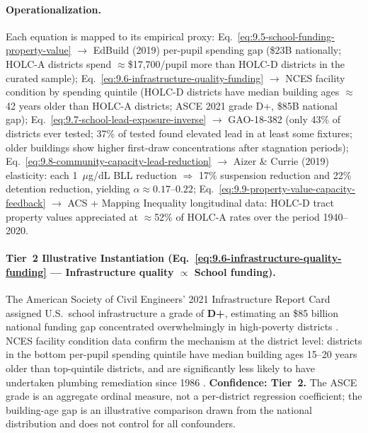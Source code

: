\paragraph{Operationalization.}
Each equation is mapped to its empirical proxy: Eq.~\ref{eq:9.5-school-funding-property-value} $\to$ EdBuild (2019) per-pupil spending gap (\$23B nationally; HOLC-A districts spend $\approx$\$17,700/pupil more than HOLC-D districts in the curated sample); Eq.~\ref{eq:9.6-infrastructure-quality-funding} $\to$ NCES facility condition by spending quintile (HOLC-D districts have median building ages $\approx$42 years older than HOLC-A districts; ASCE 2021 grade D+, \$85B national gap); Eq.~\ref{eq:9.7-school-lead-exposure-inverse} $\to$ GAO-18-382 (only 43\% of districts ever tested; 37\% of tested found elevated lead in at least some fixtures; older buildings show higher first-draw concentrations after stagnation periods); Eq.~\ref{eq:9.8-community-capacity-lead-reduction} $\to$ Aizer \& Currie (2019) elasticity: each 1~$\mu$g/dL BLL reduction $\Rightarrow$ 17\% suspension reduction and 22\% detention reduction, yielding $\alpha \approx 0.17$--$0.22$; Eq.~\ref{eq:9.9-property-value-capacity-feedback} $\to$ ACS + Mapping Inequality longitudinal data: HOLC-D tract property values appreciated at $\approx$52\% of HOLC-A rates over the period 1940--2020.

\paragraph{Tier~2 Illustrative Instantiation (Eq.~\ref{eq:9.6-infrastructure-quality-funding} --- Infrastructure quality $\propto$ School funding).}
The American Society of Civil Engineers' 2021 Infrastructure Report Card assigned U.S.\ school infrastructure a grade of \textbf{D+}, estimating an \$85 billion national funding gap concentrated overwhelmingly in high-poverty districts \cite{tel_asce}. NCES facility condition data confirm the mechanism at the district level: districts in the bottom per-pupil spending quintile have median building ages 15--20 years older than top-quintile districts, and are significantly less likely to have undertaken plumbing remediation since 1986 \cite{tel_nces}. \textbf{Confidence: Tier~2.} The ASCE grade is an aggregate ordinal measure, not a per-district regression coefficient; the building-age gap is an illustrative comparison drawn from the national distribution and does not control for all confounders.

